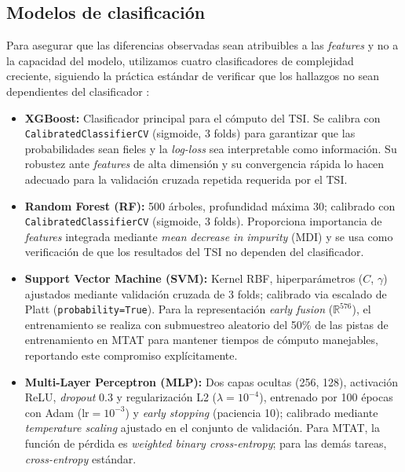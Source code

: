 \documentclass[conference]{IEEEtran}
\begin{document}
\subsection{Modelos de clasificación}

Para asegurar que las diferencias observadas sean atribuibles a las \textit{features} y no a la capacidad del modelo, utilizamos cuatro clasificadores de complejidad creciente, siguiendo la práctica estándar de verificar que los hallazgos no sean dependientes del
clasificador \cite{tamm2024comparative}:

\begin{itemize}
    \item \textbf{XGBoost:} Clasificador principal para el cómputo del TSI. Se calibra con \texttt{CalibratedClassifierCV} (sigmoide, 3 folds) para garantizar que las probabilidades sean fieles y la \textit{log-loss} sea interpretable como información. Su robustez ante \textit{features} de alta dimensión y su convergencia rápida lo hacen adecuado para la validación cruzada repetida requerida por el TSI.

    \item \textbf{Random Forest (RF):} 500 árboles, profundidad máxima 30; calibrado con \texttt{CalibratedClassifierCV} (sigmoide, 3 folds). Proporciona importancia de \textit{features} integrada mediante \textit{mean decrease in impurity} (MDI) y se usa como verificación de que los resultados del TSI no dependen del clasificador.

    \item \textbf{Support Vector Machine (SVM):} Kernel RBF, hiperparámetros ($C$, $\gamma$) ajustados mediante validación cruzada de 3 folds; calibrado via escalado de Platt (\texttt{probability=True}). Para la representación \textit{early fusion} ($\mathbb{R}^{576}$), el entrenamiento se realiza con submuestreo aleatorio del 50\% de las pistas de entrenamiento en MTAT para mantener tiempos de cómputo manejables, reportando este
    compromiso explícitamente.

    \item \textbf{Multi-Layer Perceptron (MLP):} Dos capas ocultas (256, 128), activación ReLU, \textit{dropout} 0.3 y regularización L2 ($\lambda = 10^{-4}$), entrenado por 100 épocas con Adam ($\text{lr} = 10^{-3}$) y \textit{early stopping} (paciencia 10); calibrado mediante \textit{temperature scaling} ajustado en el conjunto de validación.
    Para MTAT, la función de pérdida es \textit{weighted binary cross-entropy}; para las demás tareas, \textit{cross-entropy} estándar.
\end{itemize}
\end{document}
